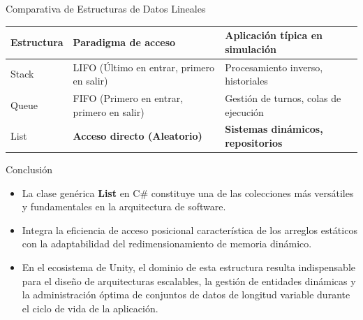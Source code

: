 \documentclass{beamer}
\begin{document}
\begin{frame}{Comparativa de Estructuras de Datos Lineales}
\begin{table}[]
\centering
\begin{tabular}{|l|l|l|}
\hline
\textbf{Estructura} & \textbf{Paradigma de acceso} & \textbf{Aplicación típica en simulación} \\ \hline
Stack & LIFO (Último en entrar, primero en salir) & Procesamiento inverso, historiales \\ \hline
Queue & FIFO (Primero en entrar, primero en salir) & Gestión de turnos, colas de ejecución \\ \hline
List & \textbf{Acceso directo (Aleatorio)} & \textbf{Sistemas dinámicos, repositorios} \\ \hline
\end{tabular}
\end{table}
\end{frame}

\begin{frame}{Conclusión}
\begin{itemize}
    \item La clase genérica \textbf{List} en C\# constituye una de las colecciones más versátiles y fundamentales en la arquitectura de software.
    \item Integra la eficiencia de acceso posicional característica de los arreglos estáticos con la adaptabilidad del redimensionamiento de memoria dinámico.
    \item En el ecosistema de Unity, el dominio de esta estructura resulta indispensable para el diseño de arquitecturas escalables, la gestión de entidades dinámicas y la administración óptima de conjuntos de datos de longitud variable durante el ciclo de vida de la aplicación.
\end{itemize}
\end{frame}
\end{document}
